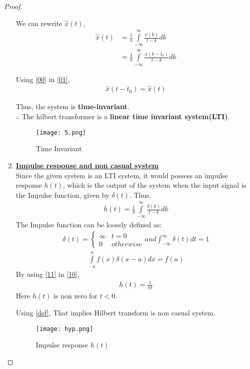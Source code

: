 \documentclass[journal,12pt,twocolumn]{IEEEtran}
\begin{document}
\begin{proof}
\begin{enumerate}
We can rewrite $\hat{x}(t)$,
\begin{align}
   \nonumber \hat{x}(t)&= \frac{1}{\pi}\int\limits_{-\infty}^{\infty}\frac{x(k)}{t-k} dk\\
    &= \frac{1}{\pi}\int\limits_{-\infty}^{\infty}\frac{x(k-t_0)}{t-k} dk\label{00}
\end{align}

Using \eqref{00} in \eqref{01},
\begin{align}
    \hat{x}(t-t_0) =\hat{x}(t) 
\end{align}

Thus, the system is \textbf{time-invariant}.\\
$\therefore$ The hilbert transformer is a \textbf{linear time invariant system(LTI)}.

 \begin{figure}[!htp]
\centering
 \texttt{[image: 5.png]}
 \caption{Time Invariant}
 \end{figure}

\item {\textbf{\underline{Impulse response and non casual system}}}\\
Since the given system is an LTI system, it would possess an impulse response $h(t)$, which is the output of the system when the input signal is the Impulse function, given by $\delta(t)$. Thus,
\begin{align}
    h(t) = \frac{1}{\pi}\int\limits_{-\infty}^{\infty}\frac{\delta(k)}{t-k} dk\label{10}
\end{align}
The Impulse function can be loosely defined as:
\begin{align}
\nonumber    \delta(t) = 
    \begin{cases}
\infty & t = 0\\
0 & otherwise
\end{cases}
and \int_{-\infty}^\infty \delta(t)dt  = 1
\end{align}
\begin{align}
\int\limits_{-a}^{a} f(x)\delta(x-a) dx = f(a)\label{11}
\end{align}
By using \eqref{11} in \eqref{10},
\begin{align}
    h(t) = \frac{1}{\pi t}
    \label{H}
\end{align}
Here $h(t)$ is non zero for $t<0$.

Using \eqref{def}, That implies Hilbert transform is non casual system.
 \begin{figure}[!htp]
\centering
 \texttt{[image: hyp.png]}
 \caption{Impulse response $h(t)$}
 \end{figure}
 

\end{enumerate}
\end{proof}
\end{document}
